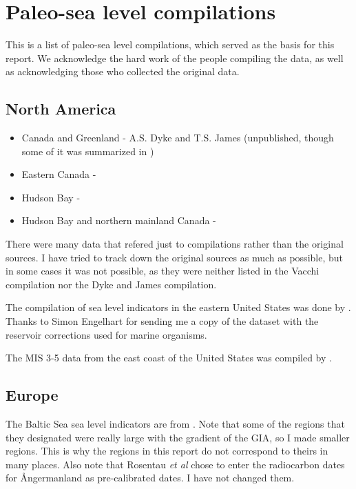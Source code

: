 \section{Paleo-sea level compilations}

This is a list of paleo-sea level compilations, which served as the basis for this report. We acknowledge the hard work of the people compiling the data, as well as acknowledging those who collected the original data.

\subsection{North America}

\begin{itemize}
  \item Canada and Greenland - A.S. Dyke and T.S. James (unpublished, though some of it was summarized in \citet{DykePeltier2000})
  \item Eastern Canada - \citet{VacchiEtal2018}
  \item Hudson Bay - \citet{SimonEtal2016}
  \item Hudson Bay and northern mainland Canada - \citet{GowanEtal2016}
\end{itemize}

There were many data that refered just to compilations rather than the original sources. I have tried to track down the original sources as much as possible, but in some cases it was not possible, as they were neither listed in the Vacchi compilation nor the Dyke and James compilation.

The compilation of sea level indicators in the eastern United States was done by \citet{EngelhartHorton2012}. Thanks to Simon Engelhart for sending me a copy of the dataset with the reservoir corrections used for marine organisms.

The MIS 3-5 data from the east coast of the United States was compiled by \citet{PicoEtal2017}.

\subsection{Europe}

\label{sec:Europe}

The Baltic Sea sea level indicators are from \citep{RosentauEtal2021}. Note that some of the regions that they designated were really large with the gradient of the GIA, so I made smaller regions. This is why the regions in this report do not correspond to theirs in many places. Also note that Rosentau \emph{et al} chose to enter the radiocarbon dates for {\AA}ngermanland as pre-calibrated dates. I have not changed them.


